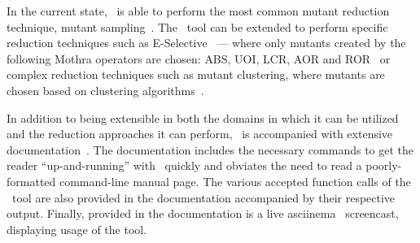 




In the current state, \mr~is able to perform the most common mutant reduction technique, mutant
sampling~\cite{gopinath2015mutation, jia2011analysis, gopinath2015empirical}.  The \mr~tool can be extended to perform
specific reduction techniques such as E-Selective~\cite{offutt1996experimental} --- where only mutants created by the
following Mothra operators are chosen: ABS, UOI, LCR, AOR and ROR~\cite{gopinath2015empirical} or complex reduction
techniques such as mutant clustering, where mutants are chosen based on clustering algorithms~\cite{jia2011analysis}.


In addition to being extensible in both the domains in which it can be utilized and the reduction approaches it can
perform, \mr~is accompanied with extensive documentation~\cite{tool}.  The documentation includes the necessary commands
to get the reader ``up-and-running'' with \mr~quickly and obviates the need to read a poorly-formatted command-line
manual page.  The various accepted function calls of the \mr~tool are also provided in the documentation accompanied by
their respective output. Finally, provided in the documentation is a live asciinema~\cite{asciinema} screencast,
displaying usage of the tool.

